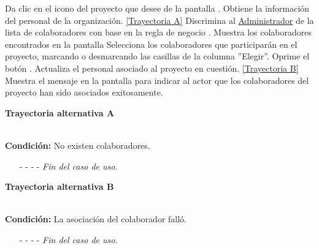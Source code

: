 	\begin{UCtrayectoria}
		\UCpaso[\UCactor] Da clic en el icono  del proyecto que desee de la pantalla .
		\UCpaso[\UCsist] Obtiene la información del personal de la organización. \hyperlink{CU4-1:TAA}{[Trayectoria A]}
		\UCpaso[\UCsist] Discrimina al \hyperlink{admin}{Administrador} de la lista de colaboradores con base en la regla de negocio .
		\UCpaso[\UCsist] Muestra los colaboradores encontrados en la pantalla 
		\UCpaso[\UCactor] Selecciona los colaboradores que participarán en el proyecto, marcando o desmarcando las casillas de la columna ''Elegir''.
		\UCpaso[\UCactor] Oprime el botón .
		\UCpaso[\UCsist] Actualiza el personal asociado al proyecto en cuestión. \hyperlink{CU4-1:TAB}{[Trayectoria B]}
		\UCpaso[\UCsist] Muestra el mensaje  en la pantalla  para indicar al actor que los colaboradores del proyecto han sido asociados exitosamente.
	\end{UCtrayectoria}		
	\hypertarget{CU4-1:TAA}{\textbf{Trayectoria alternativa A}}\\
	\noindent \textbf{Condición:} No existen colaboradores.
	\begin{enumerate}
		\UCpaso[\UCsist] Muestra el mensaje  en la pantalla  para indicar que no hay registros para mostrar.
		\item[- -] - - {\em {Fin del caso de uso}}.%
	\end{enumerate}

\hypertarget{CU4-1:TAB}{\textbf{Trayectoria alternativa B}}\\
\noindent \textbf{Condición:} La asociación del colaborador falló.
\begin{enumerate}
	\UCpaso[\UCsist] Muestra el mensaje  en la pantalla  para indicar que ocurrió un error al asociar a los colaboradores.
	\item[- -] - - {\em {Fin del caso de uso}}.%
\end{enumerate}
	
